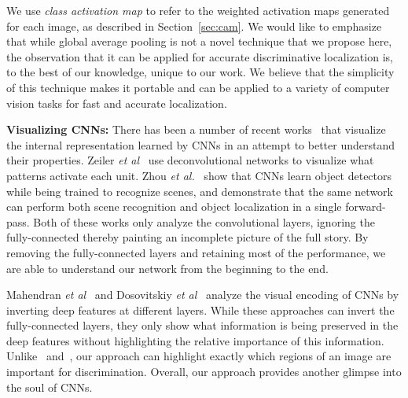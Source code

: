 \documentclass[10pt,twocolumn,letterpaper]{article}
\begin{document}
We use \textit{class activation map} to refer to the weighted activation maps generated for each image, as described in Section~\ref{sec:cam}. We would like to emphasize that while global average pooling is not a novel technique that we propose here, the observation that it can be applied for accurate discriminative localization is, to the best of our knowledge, unique to our work. We believe that the simplicity of this technique makes it portable and can be applied to a variety of computer vision tasks for fast and accurate localization.

\textbf{Visualizing CNNs:} There has been a number of recent works~\cite{zeiler2014visualizing,mahendran2004understanding,dosovitskiy2015inverting,zhou2014object} that visualize the internal representation learned by CNNs in an attempt to better understand their properties. Zeiler \textit{et al}~\cite{zeiler2014visualizing} use deconvolutional networks to visualize what patterns activate each unit. Zhou \textit{et al.}~\cite{zhou2014object} show that CNNs learn object detectors while being trained to recognize scenes, and demonstrate that the same network can perform both scene recognition and object localization in a single forward-pass. Both of these works only analyze the convolutional layers, ignoring the fully-connected thereby painting an incomplete picture of the full story. By removing the fully-connected layers and retaining most of the performance, we are able to understand our network from the beginning to the end. 

Mahendran \textit{et al}~\cite{mahendran2004understanding} and Dosovitskiy \textit{et al}~\cite{dosovitskiy2015inverting} analyze the visual encoding of CNNs by inverting deep features at different layers. While these approaches can invert the fully-connected layers, they only show what information is being preserved in the deep features without highlighting the relative importance of this information. Unlike~\cite{mahendran2004understanding} and~\cite{dosovitskiy2015inverting}, our approach  can highlight exactly which regions of an image are important for discrimination. Overall, our approach provides another glimpse into the soul of CNNs.

\end{document}
